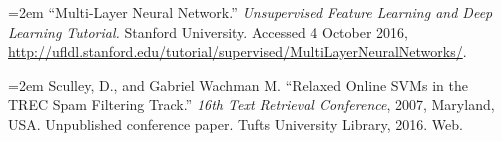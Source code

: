 \documentclass[cs,proposal]{hmcclinic}
\begin{document}
\hangindent=2em
\noindent ``Multi-Layer Neural Network.'' \textit{Unsupervised Feature Learning and Deep Learning Tutorial.} Stanford University. Accessed 4 October 2016, \url{http://ufldl.stanford.edu/tutorial/supervised/MultiLayerNeuralNetworks/}.

\hangindent=2em
\noindent Sculley, D., and Gabriel Wachman M. ``Relaxed Online SVMs in the TREC Spam Filtering Track.'' \textit{16th Text Retrieval Conference}, 2007, Maryland, USA. Unpublished conference paper. Tufts University Library, 2016. Web.

\newpage











\nocite{*} 
\end{document}
